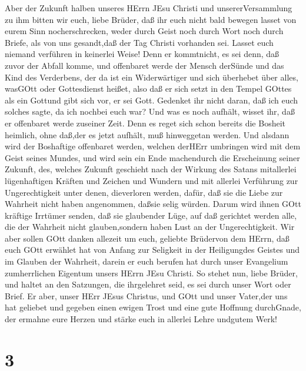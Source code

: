  Aber der Zukunft halben unseres HErrn JEsu Christi und
unsererVersammlung zu ihm bitten wir euch, liebe Brüder, 
daß ihr euch nicht bald bewegen lasset von eurem Sinn nocherschrecken,
weder durch Geist noch durch Wort noch durch Briefe, als von uns
gesandt,daß der Tag Christi vorhanden sei.  Lasset euch
niemand verführen in keinerlei Weise! Denn er kommtnicht, es sei denn,
daß zuvor der Abfall komme, und offenbaret werde der Mensch derSünde und
das Kind des Verderbens,  der da ist ein Widerwärtiger und
sich überhebet über alles, wasGOtt oder Gottesdienst heißet, also daß er
sich setzt in den Tempel GOttes als ein Gottund gibt sich vor, er sei
Gott.  Gedenket ihr nicht daran, daß ich euch solches sagte,
da ich nochbei euch war?  Und was es noch aufhält, wisset
ihr, daß er offenbaret werde zuseiner Zeit.  Denn es reget
sich schon bereits die Bosheit heimlich, ohne daß,der es jetzt aufhält,
muß hinweggetan werden.  Und alsdann wird der Boshaftige
offenbaret werden, welchen derHErr umbringen wird mit dem Geist seines
Mundes, und wird sein ein Ende machendurch die Erscheinung seiner
Zukunft,  des, welches Zukunft geschieht nach der Wirkung
des Satans mitallerlei lügenhaftigen Kräften und Zeichen und Wundern
 und mit allerlei Verführung zur Ungerechtigkeit unter
denen, dieverloren werden, dafür, daß sie die Liebe zur Wahrheit nicht
haben angenommen, daßsie selig würden.  Darum wird ihnen
GOtt kräftige Irrtümer senden, daß sie glaubender Lüge, 
auf daß gerichtet werden alle, die der Wahrheit nicht glauben,sondern
haben Lust an der Ungerechtigkeit.  Wir aber sollen GOtt
danken allezeit um euch, geliebte Brüdervon dem HErrn, daß euch GOtt
erwählet hat von Anfang zur Seligkeit in der Heiligungdes Geistes und im
Glauben der Wahrheit,  darein er euch berufen hat durch
unser Evangelium zumherrlichen Eigentum unsers HErrn JEsu Christi.
 So stehet nun, liebe Brüder, und haltet an den Satzungen,
die ihrgelehret seid, es sei durch unser Wort oder Brief. 
Er aber, unser HErr JEsus Christus, und GOtt und unser Vater,der uns hat
geliebet und gegeben einen ewigen Trost und eine gute Hoffnung
durchGnade,  der ermahne eure Herzen und stärke euch in
allerlei Lehre undgutem Werk!

\hypertarget{section-2}{%
\section{3}\label{section-2}}

